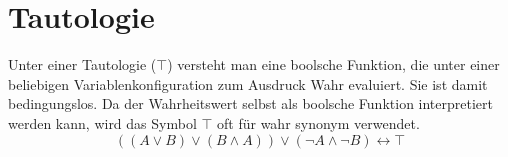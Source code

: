 \begin{comment}
\section{Logische und binäre Verknüpfungen}
%
In Zusammenhang mit dem Lernen von Programmiersprachen entsteht die Frage, was der Unterschied zwischen logischen und binären Evaluierungen von boolschen Ausdrücken ist. Wir betrachten die Programmiersprache C.
%
\lstset{language={C}, caption={Unterschied zwischen logischen und binären Operatoren}, label={lst:difflogbin}}
\begin{lstlisting}
if (6 & 1) printf("foo");
if (6 && 1) printf("bar");
\end{lstlisting}
%
Dieses Teilprogramm gibt nur ,,bar`` zurück. Für die C-Programmiersprache sei auf den Artikel \href{http://cm.bell-labs.com/who/dmr/chist.html}{,,The Development of the C Language*``} von Dennis M. Ritchie\footnote{englischsprachiger Artikel. Unterkapitel ,,Neonatal C`` geht auf den Unterschied ein. Zuletzt abgerufen im November 2012} verwiesen. Die Frage nach dem Unterschied kann wie folgt beantwortet werden:

Bei einem Binäroperator wie etwa \& oder \textbar{} werden die beiden Operanden binär interpretiert. Dies bedeutet 6 (binär \binval{110}) und-verknüpft mit 1 (binär \binval{1}) ergibt \binval{000}.
\begin{center}
  \begin{tabular}{lccc}
       & 1 & 1 & 0 \\
       & 0 & 0 & 1 \\
  \hline
    \& & 0 & 0 & 0
  \end{tabular}
\end{center}

Bei einem logischen Operator (\&\&, \textbar\textbar) wird der Ausdruck zuerst in einen Binärwert verwandelt und später binär evaluiert. So evaluiert 6 (Wahrheitswert wahr, binär \binval{1}) und 1 (Wahrheitswert wahr, binär \binval{1}) zu wahr (binär \binval{1}). Ich möchte in Erinnerung rufen, dass in der Programmiersprache C Ausdrücke gleich Null (\texttt{NULL} und \texttt{0}) als falsch interpretiert werden. Alle anderen Ausdrücke sind wahr.
\end{comment}
%
\section{Tautologie}
%
Unter einer Tautologie ($\top$) versteht man eine boolsche Funktion, die unter einer beliebigen Variablenkonfiguration zum Ausdruck Wahr evaluiert. Sie ist damit bedingungslos. Da der Wahrheitswert selbst als boolsche Funktion interpretiert werden kann, wird das Symbol $\top$ oft für wahr synonym verwendet.
\begin{equation}
  ((A \lor B) \lor (B \land A)) \lor (\neg A \land \neg B) \leftrightarrow \top
\end{equation}
%
